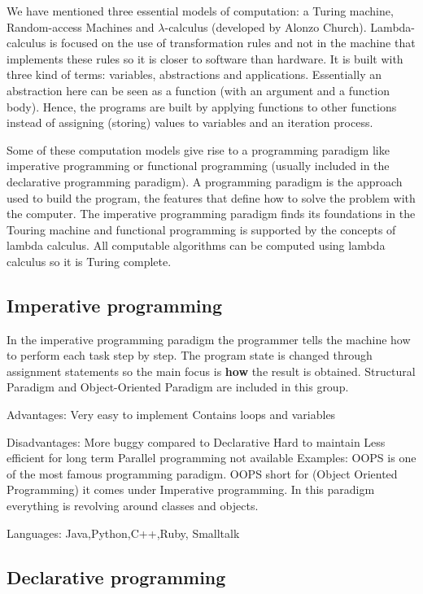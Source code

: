 We have mentioned three essential models of computation: a Turing machine, Random-access Machines and $\lambda$-calculus (developed by Alonzo Church).
Lambda-calculus is focused on the use of transformation rules and not in the machine that implements these rules so it is closer to software than hardware.
It is built with three kind of terms: variables, abstractions and applications. 
Essentially an abstraction here can be seen as a function (with an argument and a function body). 
Hence, the programs are built by applying functions to other functions instead of assigning (storing) values to variables and an iteration process. 

Some of these computation models give rise to a programming paradigm like imperative programming or functional programming (usually included in the declarative programming paradigm).
A programming paradigm is the approach used to build the program, the features that define how to solve the problem with the computer. 
The imperative programming paradigm finds its foundations in the Touring machine and functional programming is supported by the concepts of lambda calculus. 
All computable algorithms can be computed using lambda calculus so it is Turing complete.



        \subsection*{Imperative programming}
    
In the imperative programming paradigm the programmer tells the machine how to perform each task step by step. 
The program state is changed through assignment statements so the main focus is \textbf{how} the result is obtained. 
Structural Paradigm and Object-Oriented Paradigm are included in this group. 

Advantages:
Very easy to implement
Contains loops and variables

Disadvantages:
More buggy compared to Declarative
Hard to maintain
Less efficient for long term
Parallel programming not available
Examples:
OOPS is one of the most famous programming paradigm. OOPS short for (Object Oriented Programming) it comes under Imperative programming. In 
this paradigm everything is revolving around classes and objects.

Languages: Java,Python,C++,Ruby, Smalltalk


        \subsection*{Declarative programming}

